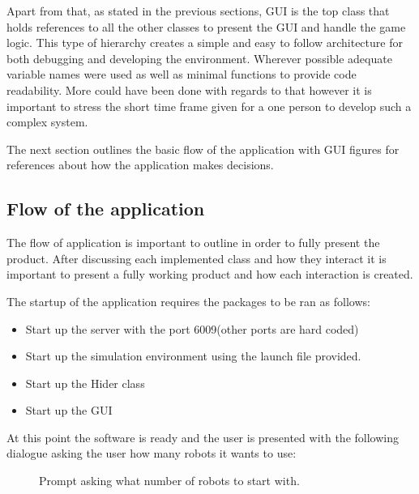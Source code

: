       Apart from that, as stated in the previous sections, GUI is the top class that holds references to all the other classes to present the GUI and handle the game logic. This type of hierarchy creates a simple and easy to follow architecture for both debugging and developing the environment. Wherever possible adequate variable names were used as well as minimal functions to provide code readability. More could have been done with regards to that however it is important to stress the short time frame given for a one person to develop such a complex system.

      The next section outlines the basic flow of the application with GUI figures for references about how the application makes decisions.

    \subsection{Flow of the application}
      The flow of application is important to outline in order to fully present the product. After discussing each implemented class and how they interact it is important to present a fully working product and how each interaction is created.

      The startup of the application requires the packages to be ran as follows:
        \begin{itemize}
          \item Start up the server with the port 6009(other ports are hard coded)
          \item Start up the simulation environment using the launch file provided.
          \item Start up the Hider class
          \item Start up the GUI
        \end{itemize}
      At this point the software is ready and the user is presented with the following dialogue asking the user how many robots it wants to use:

      \begin{figure}[htp]
        \centering
        \caption{Prompt asking what number of robots to start with.}
      \end{figure}

